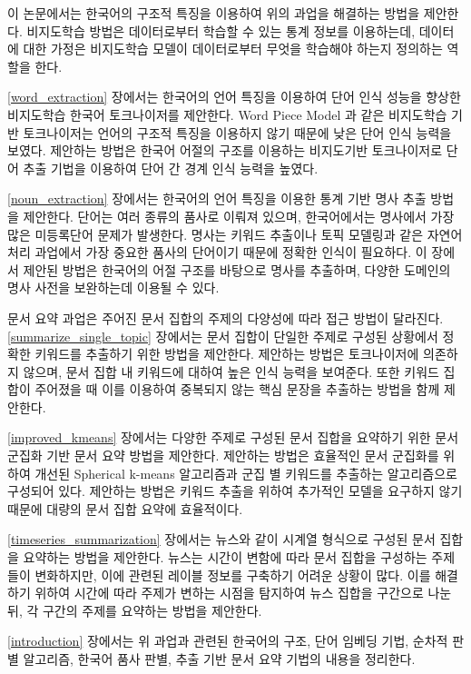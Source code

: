 \documentclass[oneside, ko,phd]{snuthesis_utf8_kor}
\begin{document}
이 논문에서는 한국어의 구조적 특징을 이용하여 위의 과업을 해결하는 방법을 제안한다.
비지도학습 방법은 데이터로부터 학습할 수 있는 통계 정보를 이용하는데, 데이터에 대한 가정은 비지도학습 모델이 데이터로부터 무엇을 학습해야 하는지 정의하는 역할을 한다.

\ref{word_extraction} 장에서는 한국어의 언어 특징을 이용하여 단어 인식 성능을 향상한 비지도학습 한국어 토크나이저를 제안한다.
Word Piece Model 과 같은 비지도학습 기반 토크나이저는 언어의 구조적 특징을 이용하지 않기 때문에 낮은 단어 인식 능력을 보였다.
제안하는 방법은 한국어 어절의 구조를 이용하는 비지도기반 토크나이저로 단어 추출 기법을 이용하여 단어 간 경계 인식 능력을 높였다.

\ref{noun_extraction} 장에서는 한국어의 언어 특징을 이용한 통계 기반 명사 추출 방법을 제안한다.
단어는 여러 종류의 품사로 이뤄져 있으며, 한국어에서는 명사에서 가장 많은 미등록단어 문제가 발생한다.
명사는 키워드 추출이나 토픽 모델링과 같은 자연어처리 과업에서 가장 중요한 품사의 단어이기 때문에 정확한 인식이 필요하다.
이 장에서 제안된 방법은 한국어의 어절 구조를 바탕으로 명사를 추출하며, 다양한 도메인의 명사 사전을 보완하는데 이용될 수 있다.

문서 요약 과업은 주어진 문서 집합의 주제의 다양성에 따라 접근 방법이 달라진다.
\ref{summarize_single_topic} 장에서는 문서 집합이 단일한 주제로 구성된 상황에서 정확한 키워드를 추출하기 위한 방법을 제안한다.
제안하는 방법은 토크나이저에 의존하지 않으며, 문서 집합 내 키워드에 대하여 높은 인식 능력을 보여준다.
또한 키워드 집합이 주어졌을 때 이를 이용하여 중복되지 않는 핵심 문장을 추출하는 방법을 함께 제안한다.

\ref{improved_kmeans} 장에서는 다양한 주제로 구성된 문서 집합을 요약하기 위한 문서 군집화 기반 문서 요약 방법을 제안한다.
제안하는 방법은 효율적인 문서 군집화를 위하여 개선된 Spherical k-means 알고리즘과 군집 별 키워드를 추출하는 알고리즘으로 구성되어 있다.
제안하는 방법은 키워드 추출을 위하여 추가적인 모델을 요구하지 않기 때문에 대량의 문서 집합 요약에 효율적이다.

\ref{timeseries_summarization} 장에서는 뉴스와 같이 시계열 형식으로 구성된 문서 집합을 요약하는 방법을 제안한다.
뉴스는 시간이 변함에 따라 문서 집합을 구성하는 주제들이 변화하지만, 이에 관련된 레이블 정보를 구축하기 어려운 상황이 많다.
이를 해결하기 위하여 시간에 따라 주제가 변하는 시점을 탐지하여 뉴스 집합을 구간으로 나눈 뒤, 각 구간의 주제를 요약하는 방법을 제안한다.

\ref{introduction} 장에서는 위 과업과 관련된 한국어의 구조, 단어 임베딩 기법, 순차적 판별 알고리즘, 한국어 품사 판별, 추출 기반 문서 요약 기법의 내용을 정리한다.
\end{document}
